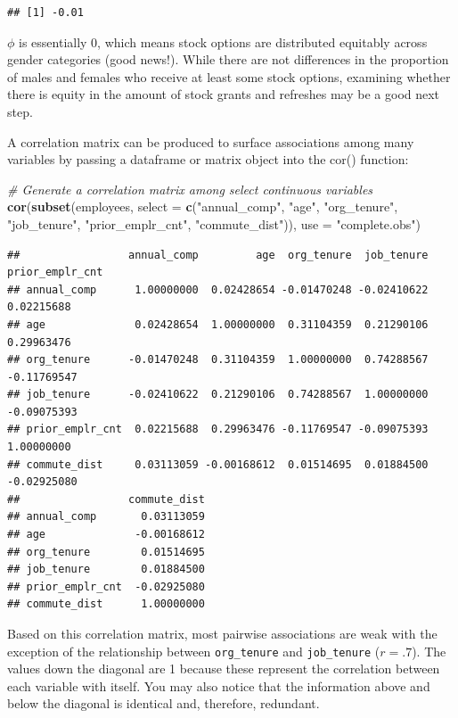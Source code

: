 \documentclass[]{book}
\newenvironment{Shaded}{\begin{snugshade}}{\end{snugshade}}
\newcommand{\CommentTok}[1]{\textcolor[rgb]{0.56,0.35,0.01}{\textit{#1}}}
\newcommand{\DataTypeTok}[1]{\textcolor[rgb]{0.13,0.29,0.53}{#1}}
\newcommand{\KeywordTok}[1]{\textcolor[rgb]{0.13,0.29,0.53}{\textbf{#1}}}
\newcommand{\NormalTok}[1]{#1}
\newcommand{\StringTok}[1]{\textcolor[rgb]{0.31,0.60,0.02}{#1}}
\begin{document}
\begin{verbatim}
## [1] -0.01
\end{verbatim}

\(\phi\) is essentially 0, which means stock options are distributed equitably across gender categories (good news!). While there are not differences in the proportion of males and females who receive at least some stock options, examining whether there is equity in the amount of stock grants and refreshes may be a good next step.

A correlation matrix can be produced to surface associations among many variables by passing a dataframe or matrix object into the cor() function:

\begin{Shaded}
\begin{Highlighting}[]
\CommentTok{# Generate a correlation matrix among select continuous variables}
\KeywordTok{cor}\NormalTok{(}\KeywordTok{subset}\NormalTok{(employees, }\DataTypeTok{select =} \KeywordTok{c}\NormalTok{(}\StringTok{"annual_comp"}\NormalTok{, }\StringTok{"age"}\NormalTok{, }\StringTok{"org_tenure"}\NormalTok{, }\StringTok{"job_tenure"}\NormalTok{, }\StringTok{"prior_emplr_cnt"}\NormalTok{, }\StringTok{"commute_dist"}\NormalTok{)), }\DataTypeTok{use =} \StringTok{"complete.obs"}\NormalTok{)}
\end{Highlighting}
\end{Shaded}

\begin{verbatim}
##                 annual_comp         age  org_tenure  job_tenure prior_emplr_cnt
## annual_comp      1.00000000  0.02428654 -0.01470248 -0.02410622      0.02215688
## age              0.02428654  1.00000000  0.31104359  0.21290106      0.29963476
## org_tenure      -0.01470248  0.31104359  1.00000000  0.74288567     -0.11769547
## job_tenure      -0.02410622  0.21290106  0.74288567  1.00000000     -0.09075393
## prior_emplr_cnt  0.02215688  0.29963476 -0.11769547 -0.09075393      1.00000000
## commute_dist     0.03113059 -0.00168612  0.01514695  0.01884500     -0.02925080
##                 commute_dist
## annual_comp       0.03113059
## age              -0.00168612
## org_tenure        0.01514695
## job_tenure        0.01884500
## prior_emplr_cnt  -0.02925080
## commute_dist      1.00000000
\end{verbatim}

Based on this correlation matrix, most pairwise associations are weak with the exception of the relationship between \texttt{org\_tenure} and \texttt{job\_tenure} (\(r = .7\)). The values down the diagonal are 1 because these represent the correlation between each variable with itself. You may also notice that the information above and below the diagonal is identical and, therefore, redundant.
\end{document}

